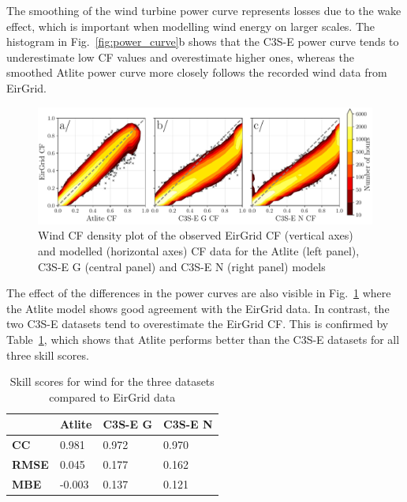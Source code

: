 \documentclass[a4paper, 11pt]{article}
\begin{document}
The smoothing of the wind turbine power curve represents losses due to the wake effect, which is important when modelling wind energy on larger scales. The histogram in Fig.~\ref{fig:power_curve}b shows that the C3S-E power curve tends to underestimate low CF values and overestimate higher ones, whereas the smoothed Atlite power curve more closely follows the recorded wind data from EirGrid.

\begin{figure}[!ht]
	\centering
	\includegraphics[width=\textwidth]{verification_wind_contour}
	\caption{Wind CF density plot of the observed EirGrid CF (vertical axes) and modelled (horizontal axes) CF data for the Atlite  (left panel), C3S-E G (central panel) and C3S-E N (right panel) models}
	\label{fig:wind_verification_contour}
\end{figure}

The effect of the differences in the power curves are also visible in Fig.~\ref{fig:wind_verification_contour} where the Atlite model shows good agreement with the EirGrid data. In contrast, the two C3S-E datasets tend to overestimate the EirGrid CF. This is confirmed by Table~\ref{tab:wind_skill_scores}, which shows that Atlite performs better than the C3S-E datasets for all three skill scores. 

\begin{table}[!ht]
	\centering
	\begin{tabular}{l|lll|}
		\cline{2-4}
		& \textbf{Atlite} & \textbf{C3S-E G} & \textbf{C3S-E N} \\ \hline
		\multicolumn{1}{|l|}{\textbf{CC}}   & 0.981           & 0.972            & 0.970            \\ \hline
		\multicolumn{1}{|l|}{\textbf{RMSE}} & 0.045           & 0.177            & 0.162            \\ \hline
		\multicolumn{1}{|l|}{\textbf{MBE}}   & -0.003          & 0.137            & 0.121            \\ \hline
	\end{tabular}
	\caption{Skill scores for wind for the three datasets compared to EirGrid data}
	\label{tab:wind_skill_scores}
\end{table}
\end{document}
